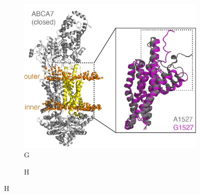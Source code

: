\begin{figure}[H]
\begin{subfigure}[t]{0.45\textwidth}
    \end{subfigure}
    \begin{subfigure}[t]{0.3\textwidth}
        \caption{G}
        \includegraphics[width=\textwidth]{./main_plots/abca7_structure_with_inset.png}        
    \end{subfigure}
    \begin{subfigure}[t]{0.165\textwidth}
        \caption{H}

\end{subfigure}
\end{figure}
